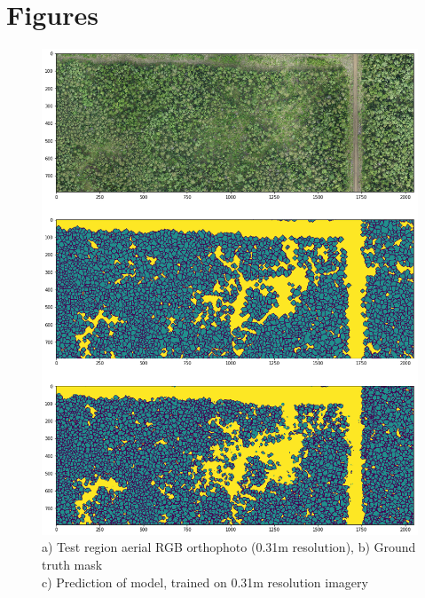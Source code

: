 \chapter{Figures}

\begin{figure}[ht]
\centering
\includegraphics[scale=0.45]{images/TEST031APP.png}
\caption{a) Test region aerial RGB orthophoto (0.31m resolution), b) Ground truth mask \\c) Prediction of model, trained on 0.31m  resolution imagery}
\label{TEST03}
\end{figure}

